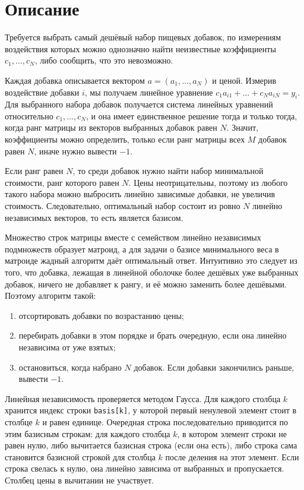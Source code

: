 \section{Описание}
Требуется выбрать самый дешёвый набор пищевых добавок, по измерениям воздействия которых можно однозначно найти неизвестные коэффициенты $c_1, \dots, c_N$, либо сообщить, что это невозможно.

Каждая добавка описывается вектором $a = (a_1, \dots, a_N)$ и ценой. Измерив воздействие добавки $i$, мы получаем линейное уравнение $c_1 a_{i1} + \dots + c_N a_{iN} = y_i$. Для выбранного набора добавок получается система линейных уравнений относительно $c_1, \dots, c_N$, и она имеет единственное решение тогда и только тогда, когда ранг матрицы из векторов выбранных добавок равен $N$. Значит, коэффициенты можно определить, только если ранг матрицы всех $M$ добавок равен $N$, иначе нужно вывести $-1$.

Если ранг равен $N$, то среди добавок нужно найти набор минимальной стоимости, ранг которого равен $N$. Цены неотрицательны, поэтому из любого такого набора можно выбросить линейно зависимые добавки, не увеличив стоимость. Следовательно, оптимальный набор состоит из ровно $N$ линейно независимых векторов, то есть является базисом.

Множество строк матрицы вместе с семейством линейно независимых подмножеств образует матроид, а для задачи о базисе минимального веса в матроиде жадный алгоритм даёт оптимальный ответ. Интуитивно это следует из того, что добавка, лежащая в линейной оболочке более дешёвых уже выбранных добавок, ничего не добавляет к рангу, и её можно заменить более дешёвыми. Поэтому алгоритм такой:
\begin{enumerate}
    \item отсортировать добавки по возрастанию цены;
    \item перебирать добавки в этом порядке и брать очередную, если она линейно независима от уже взятых;
    \item остановиться, когда набрано $N$ добавок. Если добавки закончились раньше, вывести $-1$.
\end{enumerate}

Линейная независимость проверяется методом Гаусса. Для каждого столбца $k$ хранится индекс строки \texttt{basis[k]}, у которой первый ненулевой элемент стоит в столбце $k$ и равен единице. Очередная строка последовательно приводится по этим базисным строкам: для каждого столбца $k$, в котором элемент строки не равен нулю, либо вычитается базисная строка (если она есть), либо строка сама становится базисной строкой для столбца $k$ после деления на этот элемент. Если строка свелась к нулю, она линейно зависима от выбранных и пропускается. Столбец цены в вычитании не участвует.

